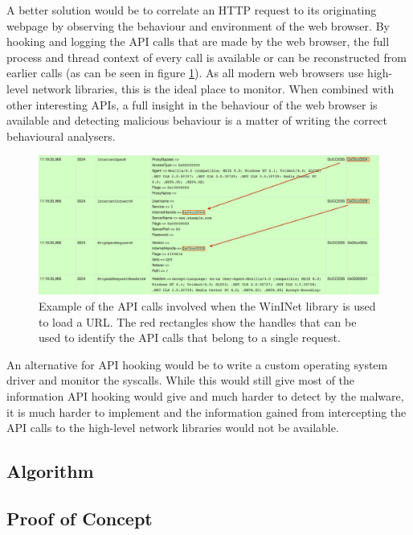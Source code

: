 A better solution would be to correlate an HTTP request to its originating webpage by observing the behaviour and environment of the web browser. By hooking and logging the API calls that are made by the web browser, the full process and thread context of every call is available or can be reconstructed from earlier calls (as can be seen in figure \ref{fig:wininet}). As all modern web browsers use high-level network libraries, this is the ideal place to monitor. When combined with other interesting APIs, a full insight in the behaviour of the web browser is available and detecting malicious behaviour is a matter of writing the correct behavioural analysers.
\begin{figure}[h]
    \centering
    \includegraphics[width=14.7cm]{Images/wininet.png}
    \caption{Example of the API calls involved when the WinINet library is used to load a URL. The red rectangles show the handles that can be used to identify the API calls that belong to a single request.}
    \label{fig:wininet}
\end{figure}

An alternative for API hooking would be to write a custom operating system driver and monitor the syscalls. While this would still give most of the information API hooking would give and much harder to detect by the malware, it is much harder to implement and the information gained from intercepting the API calls to the high-level network libraries would not be available.

\subsection{Algorithm}


\subsection{Proof of Concept}

